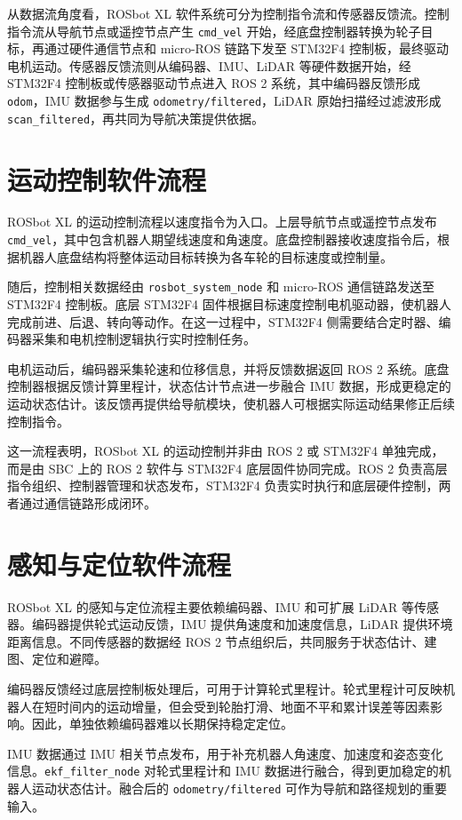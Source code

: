\documentclass[UTF8,a4paper,12pt]{ctexrep}
\begin{document}
从数据流角度看，ROSbot XL 软件系统可分为控制指令流和传感器反馈流。控制指令流从导航节点或遥控节点产生 \texttt{cmd\_vel} 开始，经底盘控制器转换为轮子目标，再通过硬件通信节点和 micro-ROS 链路下发至 STM32F4 控制板，最终驱动电机运动。传感器反馈流则从编码器、IMU、LiDAR 等硬件数据开始，经 STM32F4 控制板或传感器驱动节点进入 ROS 2 系统，其中编码器反馈形成 \texttt{odom}，IMU 数据参与生成 \texttt{odometry/filtered}，LiDAR 原始扫描经过滤波形成 \texttt{scan\_filtered}，再共同为导航决策提供依据。

\section{运动控制软件流程}

ROSbot XL 的运动控制流程以速度指令为入口。上层导航节点或遥控节点发布 \texttt{cmd\_vel}，其中包含机器人期望线速度和角速度。底盘控制器接收速度指令后，根据机器人底盘结构将整体运动目标转换为各车轮的目标速度或控制量。

随后，控制相关数据经由 \texttt{rosbot\_system\_node} 和 micro-ROS 通信链路发送至 STM32F4 控制板。底层 STM32F4 固件根据目标速度控制电机驱动器，使机器人完成前进、后退、转向等动作。在这一过程中，STM32F4 侧需要结合定时器、编码器采集和电机控制逻辑执行实时控制任务。

电机运动后，编码器采集轮速和位移信息，并将反馈数据返回 ROS 2 系统。底盘控制器根据反馈计算里程计，状态估计节点进一步融合 IMU 数据，形成更稳定的运动状态估计。该反馈再提供给导航模块，使机器人可根据实际运动结果修正后续控制指令。

这一流程表明，ROSbot XL 的运动控制并非由 ROS 2 或 STM32F4 单独完成，而是由 SBC 上的 ROS 2 软件与 STM32F4 底层固件协同完成。ROS 2 负责高层指令组织、控制器管理和状态发布，STM32F4 负责实时执行和底层硬件控制，两者通过通信链路形成闭环。

\section{感知与定位软件流程}

ROSbot XL 的感知与定位流程主要依赖编码器、IMU 和可扩展 LiDAR 等传感器。编码器提供轮式运动反馈，IMU 提供角速度和加速度信息，LiDAR 提供环境距离信息。不同传感器的数据经 ROS 2 节点组织后，共同服务于状态估计、建图、定位和避障。

编码器反馈经过底层控制板处理后，可用于计算轮式里程计。轮式里程计可反映机器人在短时间内的运动增量，但会受到轮胎打滑、地面不平和累计误差等因素影响。因此，单独依赖编码器难以长期保持稳定定位。

IMU 数据通过 IMU 相关节点发布，用于补充机器人角速度、加速度和姿态变化信息。\texttt{ekf\_filter\_node} 对轮式里程计和 IMU 数据进行融合，得到更加稳定的机器人运动状态估计。融合后的 \texttt{odometry/filtered} 可作为导航和路径规划的重要输入。
\end{document}
